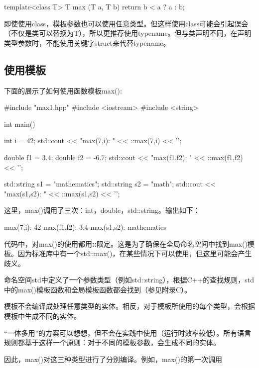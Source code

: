 \begin{cpp}
template<class T>
T max (T a, T b) {
	return b < a ? a : b;
}
\end{cpp}

即使使用class，模板参数也可以使用任意类型。但这样使用class可能会引起误会（不仅是类可以替换为T），所以更推荐使用typename。但与类声明不同，在声明类型参数时，不能使用关键字struct来代替typename。

\subsection{使用模板}

下面的展示了如何使用函数模板max():

\begin{cpp}
#include "max1.hpp"
#include <iostream>
#include <string>

int main() {
	int i = 42;
	std::cout << "max(7,i): " << ::max(7,i) << '\n';
	
	double f1 = 3.4;
	double f2 = -6.7;
	std::cout << "max(f1,f2): " << ::max(f1,f2) << '\n';
	
	std::string s1 = "mathematics";
	std::string s2 = "math";
	std::cout << "max(s1,s2): " << ::max(s1,s2) << '\n';
}
\end{cpp}

这里，max()调用了三次：int，double，std::string。输出如下：

\begin{shell}
max(7,i): 42
max(f1,f2): 3.4
max(s1,s2): mathematics
\end{shell}

代码中，对max()的使用都用\textbf{::}限定。这是为了确保在全局命名空间中找到max()模板。因为标准库中有一个std::max()，在某些情况下可以使用，但这里可能会产生歧义。

\begin{notice}
命名空间std中定义了一个参数类型（例如std::string），根据C++的查找规则，std中的max()模板函数和全局模板函数都会找到（参见附录C）。
\end{notice}

模板不会编译成处理任意类型的实体。相反，对于模板所使用的每个类型，会根据模板中生成不同的实体。

\begin{notice}
“一体多用”的方案可以想想，但不会在实践中使用（运行时效率较低）。所有语言规则都基于这样一个原则：对于不同的模板参数，会生成不同的实体。
\end{notice}

因此，max()对这三种类型进行了分别编译。例如，max()的第一次调用

